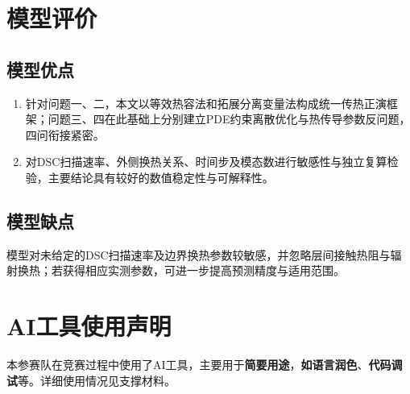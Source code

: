 \section{模型评价}

\subsection{模型优点}

\begin{enumerate}[label=\textbf{\arabic*.},leftmargin=2.2em,itemsep=0.15ex,topsep=0.15ex]
\item 针对问题一、二，本文以等效热容法和拓展分离变量法构成统一传热正演框架；问题三、四在此基础上分别建立PDE约束离散优化与热传导参数反问题，四问衔接紧密。
\item 对DSC扫描速率、外侧换热关系、时间步及模态数进行敏感性与独立复算检验，主要结论具有较好的数值稳定性与可解释性。
\end{enumerate}

\subsection{模型缺点}

模型对未给定的DSC扫描速率及边界换热参数较敏感，并忽略层间接触热阻与辐射换热；若获得相应实测参数，可进一步提高预测精度与适用范围。

\section*{AI工具使用声明}
本参赛队在竞赛过程中使用了AI工具，主要用于\textbf{简要用途}，\textbf{如语言润色}、\textbf{代码调试}等。详细使用情况见支撑材料。
